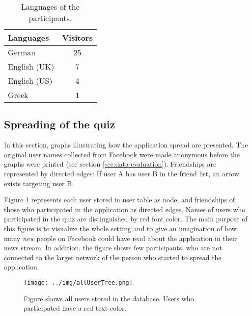 \documentclass[preprint,12pt]{elsarticle}
\begin{document}
\begin{center}
\begin{table}
\label{tab:languages}
\begin{tabular}{l | c }
Languages   & Visitors \\
\hline
German  & 25 \\
English (UK) & 7 \\
English (US) & 4 \\
Greek  & 1 \\
\end{tabular}
\caption{Languages of the participants.}
\end{table}
\end{center}


\subsection{Spreading of the quiz}
\label{sec:distribution-quiz}
In this section, graphs illustrating how the
application spread are presented. The original user names collected from Facebook were made anonymous
before the graphs were printed (see section \ref{sec:data-evaluation}). Friendships are
represented by directed edges: If user A has user B in the friend list, an
arrow exists targeting user B.

Figure \ref{fig:allUsers} represents each user stored in user
table as node, and friendships of those who participated in the
application as directed edges. Names of users who participated in the quiz are distinguished by
red font color. The main purpose of this figure is to visualize the
whole setting and to give an imagination of how many \textit{new}
people on Facebook could have read about the application in their 
news stream. In addition, the figure shows few participants, who are
not connected to the larger network of the 
person who started to spread the application.

\begin{figure}
  \texttt{[image: ../img/allUserTree.png]}
\caption{Figure shows all users stored in the database. Users who
  participated have a red text color.}
\label{fig:allUsers}
\end{figure}
\end{document}
